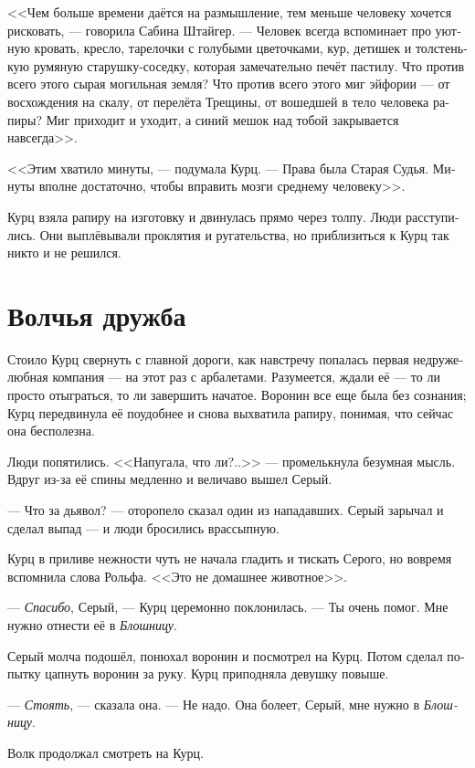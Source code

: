 \documentclass[a4paper,12pt,fleqn]{book}\usepackage{polyglossia}\setdefaultlanguage[babelshorthands=true]{russian}\setotherlanguage{english}\defaultfontfeatures{Ligatures=TeX,Mapping=tex-text}\usepackage{xcolor}\newcommand{\ml}[3]{#2}
\begin{document}
<<Чем больше времени даётся на размышление, тем меньше человеку хочется рисковать, --- говорила Сабина Штайгер.
--- Человек всегда вспоминает про уютную кровать, кресло, тарелочки с голубыми цветочками, кур, детишек и толстенькую румяную старушку-соседку, которая замечательно печёт пастилу.
Что против всего этого сырая могильная земля?
Что против всего этого миг эйфории --- от восхождения на скалу, от перелёта Трещины, от вошедшей в тело человека рапиры?
Миг приходит и уходит, а синий мешок над тобой закрывается навсегда>>.

<<Этим хватило минуты, --- подумала Курц.
--- Права была Старая Судья.
Минуты вполне достаточно, чтобы вправить мозги среднему человеку>>.

Курц взяла рапиру на изготовку и двинулась прямо через толпу.
Люди расступились.
Они выплёвывали проклятия и ругательства, но приблизиться к Курц так никто и не решился.

\section{Волчья дружба}

Стоило Курц свернуть с главной дороги, как навстречу попалась первая недружелюбная компания --- на этот раз с арбалетами.
Разумеется, ждали её --- то ли просто отыграться, то ли завершить начатое.
Воронин все еще была без сознания;
Курц передвинула её поудобнее и снова выхватила рапиру, понимая, что сейчас она бесполезна.

Люди попятились.
<<Напугала, что ли?..>> --- промелькнула безумная мысль.
Вдруг из-за её спины медленно и величаво вышел Серый.

--- Что за дьявол? --- оторопело сказал один из нападавших.
Серый зарычал и сделал выпад --- и люди бросились врассыпную.

Курц в приливе нежности чуть не начала гладить и тискать Серого, но вовремя вспомнила слова Рольфа.
<<Это не домашнее животное>>.

--- \textit{Спасибо}, Серый, --- Курц церемонно поклонилась.
--- Ты очень помог.
Мне нужно отнести её в \textit{Блошницу}.

Серый молча подошёл, понюхал воронин и посмотрел на Курц.
Потом сделал попытку цапнуть воронин за руку.
Курц приподняла девушку повыше.

--- \textit{Стоять}, --- сказала она.
--- Не надо.
Она болеет, Серый, мне нужно в \textit{Блошницу}.

Волк продолжал смотреть на Курц.
\end{document}
